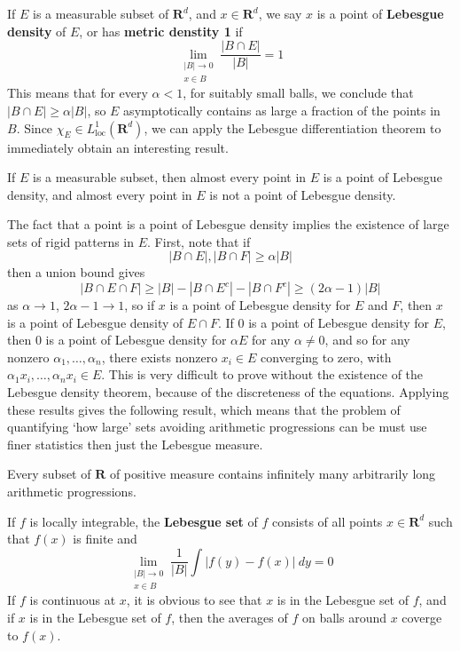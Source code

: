 If $E$ is a measurable subset of $\mathbf{R}^d$, and $x \in \mathbf{R}^d$, we say $x$ is a point of {\bf Lebesgue density} of $E$, or has {\bf metric denstity 1} if
%
\[ \lim_{\substack{|B| \to 0\\x \in B}} \frac{|B \cap E|}{|B|} = 1 \]
%
This means that for every $\alpha < 1$, for suitably small balls, we conclude that $|B \cap E| \geq \alpha |B|$, so $E$ asymptotically contains as large a fraction of the points in $B$. Since $\chi_E \in L^1_{\text{loc}}(\mathbf{R}^d)$, we can apply the Lebesgue differentiation theorem to immediately obtain an interesting result.

\begin{theorem}
    If $E$ is a measurable subset, then almost every point in $E$ is a point of Lebesgue density, and almost every point in $E$ is not a point of Lebesgue density.
\end{theorem}

The fact that a point is a point of Lebesgue density implies the existence of large sets of rigid patterns in $E$. First, note that if
%
\[ |B \cap E|, |B \cap F| \geq \alpha |B| \]
%
then a union bound gives
%
\[ |B \cap E \cap F| \geq |B| - |B \cap E^c| - |B \cap F^c| \geq (2 \alpha - 1) |B| \]
%
as $\alpha \to 1$, $2\alpha - 1 \to 1$, so if $x$ is a point of Lebesgue density for $E$ and $F$, then $x$ is a point of Lebesgue density of $E \cap F$. If $0$ is a point of Lebesgue density for $E$, then $0$ is a point of Lebesgue density for $\alpha E$ for any $\alpha \neq 0$, and so for any nonzero $\alpha_1, \dots, \alpha_n$, there exists nonzero $x_i \in E$ converging to zero, with $\alpha_1 x_i, \dots, \alpha_n x_i \in E$. This is very difficult to prove without the existence of the Lebesgue density theorem, because of the discreteness of the equations. Applying these results gives the following result, which means that the problem of quantifying `how large' sets avoiding arithmetic progressions can be must use finer statistics then just the Lebesgue measure.

\begin{theorem}
    Every subset of $\mathbf{R}$ of positive measure contains infinitely many arbitrarily long arithmetic progressions.
\end{theorem}

If $f$ is locally integrable, the {\bf Lebesgue set} of $f$ consists of all points $x \in \mathbf{R}^d$ such that $f(x)$ is finite and
%
\[ \lim_{\substack{|B| \to 0\\x \in B}} \frac{1}{|B|} \int |f(y) - f(x)|\ dy = 0 \]
%
If $f$ is continuous at $x$, it is obvious to see that $x$ is in the Lebesgue set of $f$, and if $x$ is in the Lebesgue set of $f$, then the averages of $f$ on balls around $x$ coverge to $f(x)$.

